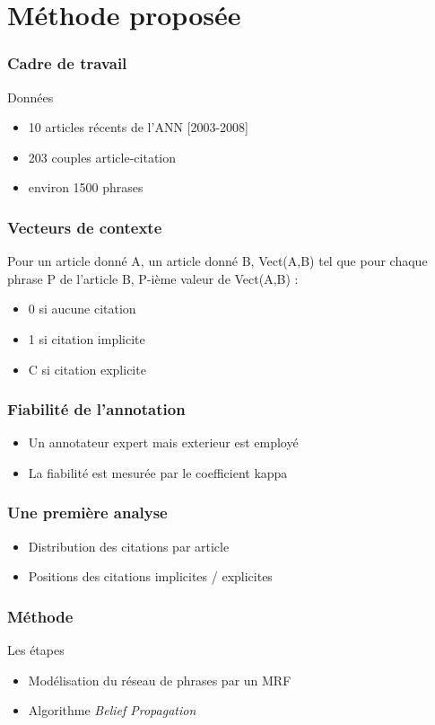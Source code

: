 \documentclass[12pt]{beamer}
\begin{document}
\section{Méthode proposée}

\begin{frame}
  \frametitle{Cadre de travail}
  \begin{block}{Données}
  \begin{itemize}
    \item 10 articles récents de l'ANN [2003-2008]
    \item 203 couples article-citation
    \item environ 1500 phrases
  \end{itemize}
  \end{block}
\end{frame}

\begin{frame}
  \frametitle{Vecteurs de contexte}
  Pour un article donné A, un article donné B,
  Vect(A,B) tel que pour chaque phrase P de l'article B, P-ième valeur de Vect(A,B) :
  \begin{itemize}
    \item 0 si aucune citation
    \item 1 si citation implicite
    \item C si citation explicite
  \end{itemize}
\end{frame}

\begin{frame}
  \frametitle{Fiabilité de l'annotation}
  \begin{itemize}
    \item Un annotateur expert mais exterieur est employé
    \item La fiabilité est mesurée par le coefficient kappa
  \end{itemize}
\end{frame}

\begin{frame}
  \frametitle{Une première analyse}
  \begin{itemize}
    \item Distribution des citations par article
    \item Positions des citations implicites / explicites
  \end{itemize}
\end{frame}

\begin{frame}
  \frametitle{Méthode}
  Les étapes
  \begin{itemize}
    \item Modélisation du réseau de phrases par un MRF
    \item Algorithme \textit{Belief Propagation}
  \end{itemize}
\end{frame}
\end{document}
